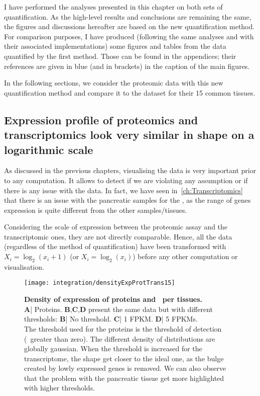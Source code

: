 I have performed the analyses presented in this chapter on both sets of
quantification. As the high-level results and conclusions are remaining the same,
the figures and discussions hereafter are based on
the new quantification method. For comparison purposes,
I have produced (following the same analyses and with their associated
implementations) some figures and tables from the data quantified by the first
method. Those can be found in the appendices; their references
are given in blue (and in brackets) in the caption of the main figures.

In the following sections, we consider the proteomic data with this new
quantification method and compare it to the  dataset
for their 15 common tissues.

\subsection{Expression profile of proteomics and transcriptomics look very
similar in shape on a logarithmic scale}
\label{subsec:IntegrationExpProfileSim}

As discussed in the previous chapters, visualising the data is very important
prior to any computation. It allows to detect if we are violating
any assumption or if there is any issue with the data. In fact, we have seen
in~\cref{ch:Transcriptomics} that there is an issue with the pancreatic
samples for the , as the range of genes expression is quite
different from the other samples/tissues.

Considering the scale of expression between the proteomic assay and the
transcriptomic ones, they are not directly comparable. Hence,
all the data (regardless of the method of quantification) have been transformed
with $X_{i}=\log_{2} (x_{i}+1)$ (or $X_{i}=\log_{2} (x_{i})$)
before any other computation or visualisation.


\begin{figure}[!htbp]
    \texttt{[image: integration/densityExpProtTrans15]}\centering
    \caption[Density of expression of proteins and \mRNAs\ per
    tissues.]
    {\label{fig:densityExpProtTrans15}\textbf{Density of expression of
    proteins and \mRNAs\ per tissues.} \\\textbf{A}| Proteins.
    \textbf{B},\textbf{C},\textbf{D} present the same data but with
    different thresholds:
    \textbf{B}| No threshold. \textbf{C}| 1 \gls{FPKM}.
    \textbf{D}| 5 \glspl{FPKM}.\\The threshold used for the proteins is the
    threshold of
    detection (\ie\ greater than zero). The different density of distributions are
    globally gaussian. When the threshold is increased for the transcriptome, the
    shape get closer to the ideal one, as the bulge created by lowly expressed
    genes is removed. We can also observe that the problem with the pancreatic
    tissue get more highlighted with higher thresholds.}
\end{figure}

